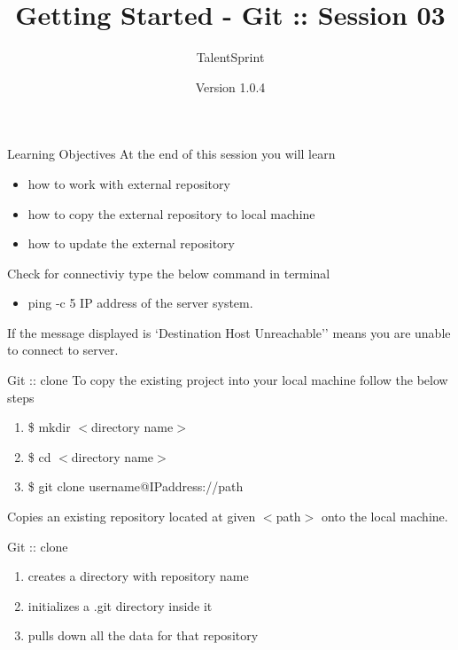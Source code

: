 \documentclass[14pt]{beamer}
\title[BPT:VCS:03]{Getting Started - Git :: Session 03}
\author[TS]{TalentSprint}
\institute[L\&D]{Licensed To Skill}
\date{Version 1.0.4}
\begin{document}
\begin{frame}
  \titlepage
\end{frame}

\begin{frame}{Learning Objectives}
At the end of this session you will learn
  \begin{itemize}
  \item how to work with external repository
  \item how to copy the external repository to local machine
  \item how to update the external repository
  \end{itemize}
\end{frame}

\begin{frame}{Check for connectiviy}
type the below command in terminal
\begin{itemize}
\item ping -c 5 IP address of the server system.
\end{itemize}
\begin{block}{}
If the message displayed is `Destination Host Unreachable'' means you are unable to connect to server.
\end{block}
\end{frame}

\begin{frame}{Git :: clone}
To copy the existing project into your local machine follow the below steps
\begin{enumerate}
\item \$ mkdir $<$directory name$>$
\item \$ cd $<$directory name$>$
\item \$ git clone username@IPaddress://path
\end{enumerate}
\begin{block}{}
Copies an existing repository located at given $<$path$>$ onto the local machine.
\end{block}
\end{frame}

\begin{frame}{Git :: clone}
\begin{enumerate}
\item creates a directory with repository name
\item initializes a .git directory inside it
\item pulls down all the data for that repository
\end{enumerate}
\end{frame}
\end{document}

